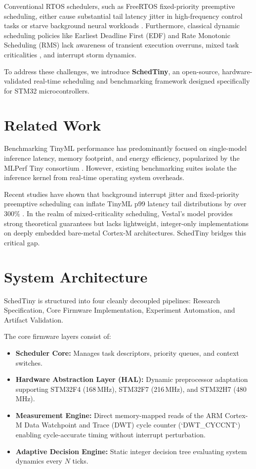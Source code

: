 \documentclass[conference]{IEEEtran}
\begin{document}
Conventional RTOS schedulers, such as FreeRTOS fixed-priority preemptive scheduling, either cause substantial tail latency jitter in high-frequency control tasks or starve background neural workloads \cite{oliveira2023scheduling}. Furthermore, classical dynamic scheduling policies like Earliest Deadline First (EDF) and Rate Monotonic Scheduling (RMS) \cite{liu1973scheduling} lack awareness of transient execution overruns, mixed task criticalities \cite{vestal2007preemptive}, and interrupt storm dynamics.

To address these challenges, we introduce \textbf{SchedTiny}, an open-source, hardware-validated real-time scheduling and benchmarking framework designed specifically for STM32 microcontrollers. 

\section{Related Work}
Benchmarking TinyML performance has predominantly focused on single-model inference latency, memory footprint, and energy efficiency, popularized by the MLPerf Tiny consortium \cite{banbury2020benchmarking, mlcommons2021mlperftiny}. However, existing benchmarking suites isolate the inference kernel from real-time operating system overheads. 

Recent studies have shown that background interrupt jitter and fixed-priority preemptive scheduling can inflate TinyML p99 latency tail distributions by over $300\%$ \cite{scheduling2024tinyml, immonen2022tiny}. In the realm of mixed-criticality scheduling, Vestal's model \cite{vestal2007preemptive} provides strong theoretical guarantees but lacks lightweight, integer-only implementations on deeply embedded bare-metal Cortex-M architectures. SchedTiny bridges this critical gap.

\section{System Architecture}
SchedTiny is structured into four cleanly decoupled pipelines: Research Specification, Core Firmware Implementation, Experiment Automation, and Artifact Validation.

The core firmware layers consist of:
\begin{itemize}
    \item \textbf{Scheduler Core:} Manages task descriptors, priority queues, and context switches.
    \item \textbf{Hardware Abstraction Layer (HAL):} Dynamic preprocessor adaptation supporting STM32F4 (168\,MHz), STM32F7 (216\,MHz), and STM32H7 (480\,MHz).
    \item \textbf{Measurement Engine:} Direct memory-mapped reads of the ARM Cortex-M Data Watchpoint and Trace (DWT) cycle counter (`DWT\_CYCCNT`) enabling cycle-accurate timing without interrupt perturbation.
    \item \textbf{Adaptive Decision Engine:} Static integer decision tree evaluating system dynamics every $N$ ticks.
\end{itemize}
\end{document}
